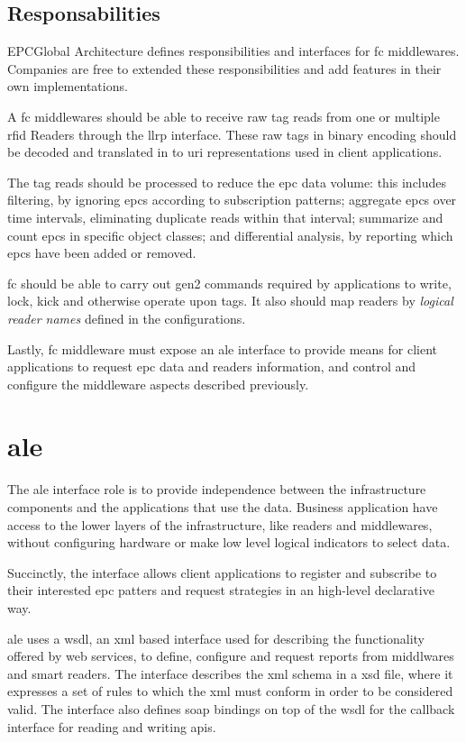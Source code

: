 \subsection{Responsabilities}

EPCGlobal Architecture defines responsibilities and interfaces for \ac{fc} middlewares. Companies are free to extended these responsibilities and add features in their own implementations.

A \ac{fc} middlewares should be able to receive raw tag reads from one or multiple \ac{rfid} Readers through the \ac{llrp} interface.
These raw tags in binary encoding should be decoded and translated in to \ac{uri} representations used in client applications.

The tag reads should be processed to reduce the \ac{epc} data volume: this includes filtering, by ignoring \acp{epc} according to subscription patterns; 
aggregate \acp{epc} over time intervals, eliminating duplicate reads within that interval;
summarize and count \acp{epc} in specific object classes;
and differential analysis, by reporting which \acp{epc} have been added or removed.

\ac{fc} should be able to carry out \ac{gen2} commands required by applications to write, lock, kick and otherwise operate upon tags.
It also should map readers by \textit{logical reader names} defined in the configurations.

Lastly, \ac{fc} middleware must expose an \ac{ale} interface to provide means for client applications to request \ac{epc} data and readers information, and control and configure the middleware aspects described previously.

\section{\acf{ale}}

The \ac{ale} interface role is to provide independence  between the infrastructure components and the applications that use the data.
Business application have access to the lower layers of the infrastructure, like readers and middlewares, without configuring hardware or make low level logical indicators to select data.

Succinctly, the interface allows client applications to register and subscribe to their interested \ac{epc} patters and request strategies in an high-level declarative way.

\ac{ale} uses a \ac{wsdl}, an \ac{xml} based interface used for describing the functionality offered by web services, to define, configure and request reports from middlwares and smart readers.
The interface describes the \ac{xml} schema in a \ac{xsd} file, where it expresses a set of rules to which the \ac{xml} must conform in order to be considered valid. 
The interface also defines \ac{soap} bindings on top of the \ac{wsdl} for the callback interface for reading and writing \acp{api}.

